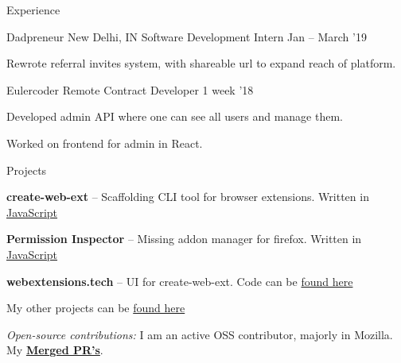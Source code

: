 \documentclass{resume} %
\begin{document}
\begin{rSection}{Experience}
  \begin{rWorkSection}{Dadpreneur}
                     {New Delhi, IN}
                     {Software Development Intern}
                     {Jan -- March '19}
  {
    \item Rewrote referral invites system, with shareable url to expand reach of platform.
  }
  \end{rWorkSection}

  \begin{rWorkSection}{Eulercoder}
                    {Remote}
                    {Contract Developer}
                    {1 week '18}
  {
    \item Developed admin API where one can see all users and manage them.
    \item Worked on frontend for admin in React.
  }
  \end{rWorkSection}
\end{rSection}


\begin{rSection}{Projects}
  \begin{rProjectSection}
    \item \textbf {create-web-ext} -- Scaffolding CLI tool for browser extensions. Written in \href{https://github.com/web-ext-labs/create-web-ext}{JavaScript}
    \item \textbf {Permission Inspector} --   Missing addon manager for firefox. Written in \href{https://github.com/tsl143/addonManager}{JavaScript}
    \item \textbf {webextensions.tech} -- UI for create-web-ext. Code can be \href{https://github.com/web-ext-labs/ui-tool}{found here}
    \item My other projects can be \href{hhttps://championshuttler.com/#projects/}{found here}
  \end{rProjectSection}

  \begin{rBlurbSection}
    \item {\em Open-source contributions:}
      I am an active OSS contributor, majorly in Mozilla. My \href{https://github.com/issues?q=is%3Apr+author%3Achampionshuttler}{\textbf{Merged PR's}}.
  \end{rBlurbSection}
\end{rSection}
\end{document}
